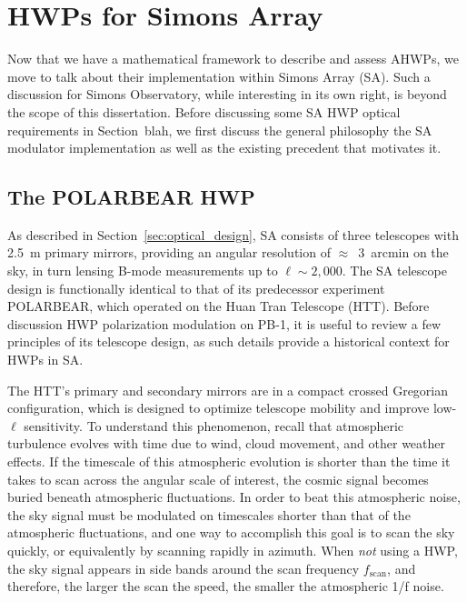 
\section{HWPs for Simons Array}
\label{sec:hwps_for_simons_array}

Now that we have a mathematical framework to describe and assess AHWPs, we move to talk about their implementation within Simons Array (SA). Such a discussion for Simons Observatory, while interesting in its own right, is beyond the scope of this dissertation. Before discussing some SA HWP optical requirements in Section~blah, we first discuss the general philosophy the SA modulator implementation as well as the existing precedent that motivates it.


\subsection{The POLARBEAR HWP}
\label{sec:pb_hwp}

As described in Section~\ref{sec:optical_design}, SA consists of three telescopes with 2.5~m primary mirrors, providing an angular resolution of $\approx$~3~arcmin on the sky, in turn lensing B-mode measurements up to $\ell \sim 2,000$. The SA telescope design is functionally identical to that of its predecessor experiment POLARBEAR, which operated on the Huan Tran Telescope (HTT). Before discussion HWP polarization modulation on PB-1, it is useful to review a few principles of its telescope design, as such details provide a historical context for HWPs in SA.

The HTT's primary and secondary mirrors are in a compact crossed Gregorian configuration, which is designed to optimize telescope mobility and improve low-$\ell$ sensitivity. To understand this phenomenon, recall that atmospheric turbulence evolves with time due to wind, cloud movement, and other weather effects. If the timescale of this atmospheric evolution is shorter than the time it takes to scan across the angular scale of interest, the cosmic signal becomes buried beneath atmospheric fluctuations. In order to beat this atmospheric noise, the sky signal must be modulated on timescales shorter than that of the atmospheric fluctuations, and one way to accomplish this goal is to scan the sky quickly, or equivalently by scanning rapidly in azimuth. When \textit{not} using a HWP, the sky signal appears in side bands around the scan frequency $f_{\mathrm{scan}}$, and therefore, the larger the scan the speed, the smaller the atmospheric 1/f noise.

